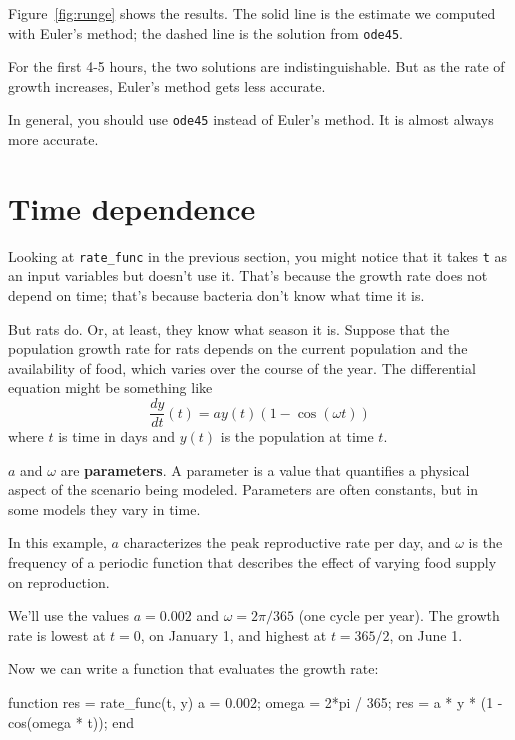 \documentclass[
]{book}
\numberwithin{Answer}{chapter}
\numberwithin{Exercise}{chapter}
\begin{document}
Figure~\ref{fig:runge} shows the results.  The solid line is the estimate we computed with Euler's method; the dashed line is the solution from {\tt ode45}.

For the first 4-5 hours, the two solutions are indistinguishable.  But as the rate of growth increases, Euler's method gets less accurate.

In general, you should use {\tt ode45} instead of Euler's method.  It is almost always more accurate.  


\section{Time dependence}

Looking at \verb"rate_func" in the previous section, you might notice that it takes {\tt t} as an input variables but doesn't use it.  That's because the growth rate does not depend on time; that's because bacteria don't know what time it is.


But rats do.  Or, at least, they know what season it is.
Suppose that the population growth rate for rats
depends on the current population and the availability of food,
which varies over the course of the year.
The differential equation might be something like
%
\begin{equation}
\frac{dy}{dt}(t) = a y(t) \left(1 - \cos (\omega t) \right)
\end{equation}
%
where $t$ is time in days and $y(t)$ is the population at time $t$.

$a$ and $\omega$ are {\bf parameters}.  A parameter is a value that
quantifies a physical aspect of the scenario being modeled.  Parameters are often constants, but in some models they vary in time.


In this example, $a$ characterizes the peak reproductive rate per day, and
$\omega$ is the frequency of a periodic function that describes
the effect of varying food supply on reproduction.

We'll use the values $a = 0.002$
and $\omega = 2 \pi/365$ (one cycle per year).
The growth rate is lowest at $t=0$, on January 1, and highest at $t=365/2$, on June 1.

Now we can write a function that evaluates the growth rate:

\begin{code}
function res = rate_func(t, y)
    a = 0.002;
    omega = 2*pi / 365;
    res = a * y * (1 - cos(omega * t));
end
\end{code}
\end{document}
